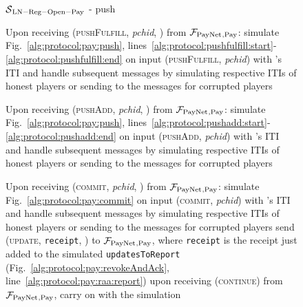 \begin{figure}[H]
  \begin{simulatorbox}{$\mathcal{S}{}_{\mathrm{LN - Reg - Open - Pay}}$ - push}
    \begin{algorithmic}[1]
      \State Upon receiving (\textsc{pushFulfill}, \textit{pchid}, \alice) from
      $\mathcal{F}_{\mathrm{PayNet}}{}_{\mathrm{, Pay}}$:
      \Indent
        \State simulate Fig.~\ref{alg:protocol:pay:push},
        lines~\ref{alg:protocol:pushfulfill:start}-\ref{alg:protocol:pushfulfill:end}
        on input (\textsc{pushFulfill}, \textit{pchid}) with \alice's ITI and
        handle subsequent messages by simulating respective ITIs of honest
        players or sending to \adversary{} the messages for corrupted players
        \label{alg:sim:push:fulfill}
      \EndIndent
      \Statex

      \State Upon receiving (\textsc{pushAdd}, \textit{pchid}, \alice) from
      $\mathcal{F}_{\mathrm{PayNet}}{}_{\mathrm{, Pay}}$:
      \Indent
        \State simulate Fig.~\ref{alg:protocol:pay:push},
        lines~\ref{alg:protocol:pushadd:start}-\ref{alg:protocol:pushadd:end} on
        input (\textsc{pushAdd}, \textit{pchid}) with \alice's ITI and handle
        subsequent messages by simulating respective ITIs of honest players or
        sending to \adversary{} the messages for corrupted players
        \label{alg:sim:push:add}
      \EndIndent
      \Statex

      \State Upon receiving (\textsc{commit}, \textit{pchid}, \alice) from
      $\mathcal{F}_{\mathrm{PayNet}}{}_{\mathrm{, Pay}}$:
      \Indent
        \State simulate Fig.~\ref{alg:protocol:pay:commit} on input
        (\textsc{commit}, \textit{pchid}) with \alice's ITI and handle
        subsequent messages by simulating respective ITIs of honest players or
        sending to \adversary{} the messages for corrupted players
        \label{alg:sim:push:commit}
          \State send (\textsc{update}, \texttt{receipt}, \alice) to
          $\mathcal{F}_{\mathrm{PayNet}}{}_{\mathrm{, Pay}}$, where \texttt{receipt} is the receipt
          just added to the simulated \texttt{updatesToReport}
          (Fig.~\ref{alg:protocol:pay:revokeAndAck},
          line~\ref{alg:protocol:pay:raa:report})
          \State upon receiving (\textsc{continue}) from $\mathcal{F}_{\mathrm{PayNet}}{}_{\mathrm{,
          Pay}}$, carry on with the simulation
        \EndIf
      \EndIndent
    \end{algorithmic}
  \end{simulatorbox}
  \caption{}
  \label{alg:sim:push}
\end{figure}

